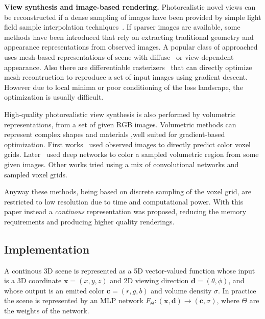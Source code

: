 \textbf{View synthesis and image-based rendering.} Photorealistic novel views 
can be reconstructed if a dense sampling of images have been provided by 
simple light field sample interpolation techniques~\cite{nerf21,nerf5}.
If sparser images are available, some methods have been introduced that 
rely on extracting traditional geometry and appearance representations
from observed images. A popular class of approached uses mesh-based representations
of scene with diffuse~\cite{nerf48} or view-dependent~\cite{nerf2} appearance. Also there are differentiable
rasterizers~\cite{nerf4,nerf10,nerf23} that can directly optimize mesh recontruction to reproduce
a set of input images using gradient descent. However due to local minima or 
poor conditioning of the loss landscape, the optimization is usually difficult.

High-quality photorealistic view synthesis is also performed by volumetric representations,
from a set of given RGB images. Volumetric methods can represent complex shapes and materials
,well suited for gradient-based optimization. First works~\cite{nerf19} used observed images to directly predict color voxel grids.
Later~\cite{nerf9,nerf13,nerf17} used deep networks to color a sampled volumetric region from some given images.
Other works tried using a mix of convolutional networks and sampled voxel grids.

Anyway these methods, being based on discrete sampling of the voxel grid, are restricted to low resolution due to time 
and computational power. With this paper instead a \textit{continous} representation was proposed, reducing 
the memory requirements and producing higher quality renderings.

\subsection{Implementation}
A continous 3D scene is represented as a 5D vector-valued function whose input is a 3D coordinate 
$\textbf{x}=(x,y,z)$ and 2D viewing direction $\textbf{d}=(\theta,\phi)$, and whose output is an emited color 
$\textbf{c} = (r,g,b)$ and volume density $\sigma$. In practice the scene is represented by an MLP network
$F_{\Theta}:(\textbf{x},\textbf{d}) \rightarrow (\textbf{c},\sigma)$, where $\Theta$ are the weights of the network.

